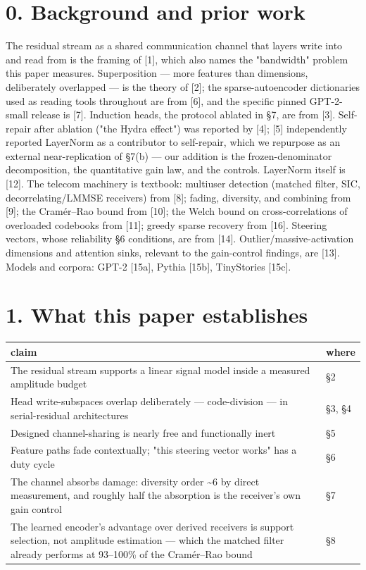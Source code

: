 \documentclass[10pt]{article}
\begin{document}
\section{0. Background and prior work}

The residual stream as a shared communication channel that layers write into and read from is the
framing of [1], which also names the "bandwidth" problem this paper measures. Superposition --- more
features than dimensions, deliberately overlapped --- is the theory of [2]; the sparse-autoencoder
dictionaries used as reading tools throughout are from [6], and the specific pinned GPT-2-small
release is [7]. Induction heads, the protocol ablated in §7, are from [3]. Self-repair after
ablation ("the Hydra effect") was reported by [4]; [5] independently reported LayerNorm as a
contributor to self-repair, which we repurpose as an external near-replication of §7(b) --- our
addition is the frozen-denominator decomposition, the quantitative gain law, and the controls.
LayerNorm itself is [12]. The telecom machinery is textbook: multiuser detection (matched filter,
SIC, decorrelating/LMMSE receivers) from [8]; fading, diversity, and combining from [9]; the
Cramér--Rao bound from [10]; the Welch bound on cross-correlations of overloaded codebooks from
[11]; greedy sparse recovery from [16]. Steering vectors, whose reliability §6 conditions, are from
[14]. Outlier/massive-activation dimensions and attention sinks, relevant to the gain-control
findings, are [13]. Models and corpora: GPT-2 [15a], Pythia [15b], TinyStories [15c].

\section{1. What this paper establishes}

\begin{center}\small\begin{tabular}{ll}
\toprule
claim & where \\
\midrule
\parbox[t]{0.46\linewidth}{The residual stream supports a linear signal model inside a measured amplitude budget} & §2 \\
\parbox[t]{0.46\linewidth}{Head write-subspaces overlap deliberately --- code-division --- in serial-residual architectures} & §3, §4 \\
\parbox[t]{0.46\linewidth}{Designed channel-sharing is nearly free and functionally inert} & §5 \\
\parbox[t]{0.46\linewidth}{Feature paths fade contextually; "this steering vector works" has a duty cycle} & §6 \\
\parbox[t]{0.46\linewidth}{The channel absorbs damage: diversity order \textasciitilde{}6 by direct measurement, and roughly half the absorption is the receiver's own gain control} & §7 \\
\parbox[t]{0.46\linewidth}{The learned encoder's advantage over derived receivers is support selection, not amplitude estimation --- which the matched filter already performs at 93--100\% of the Cramér--Rao bound} & §8 \\
\bottomrule
\end{tabular}\end{center}
\end{document}
